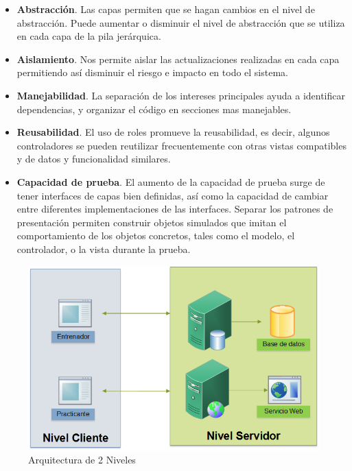 \begin{itemize}
	\item \textbf{Abstracción}. Las capas permiten que se hagan cambios en el nivel de abstracción. Puede aumentar o disminuir el nivel de abstracción que se utiliza en cada capa de la pila jerárquica.
	\item \textbf{Aislamiento}. Nos permite aislar las actualizaciones realizadas en cada capa permitiendo así disminuir el riesgo e impacto en todo el sistema.
	\item \textbf{Manejabilidad}. La separación de los intereses principales ayuda a identificar dependencias, y organizar el código en secciones mas manejables.
	\item \textbf{Reusabilidad}. El uso de roles promueve la reusabilidad, es decir, algunos controladores se pueden reutilizar frecuentemente con otras vistas compatibles y de datos y funcionalidad similares.
	\item \textbf{Capacidad de prueba}. El aumento de la capacidad de prueba surge de tener interfaces de capas bien definidas, así como la capacidad de cambiar entre diferentes implementaciones de las interfaces. Separar los patrones de presentación permiten construir objetos simulados que imitan el comportamiento de los objetos concretos, tales como el modelo, el controlador, o la vista durante la prueba.
\end{itemize}

\begin{figure}[H]
	\begin{center}
		\includegraphics[scale=0.5]{./Figuras/Arquitectura/Arquitectura2Niveles}
	\end{center}
	\caption{Arquitectura de 2 Niveles}
	\label{fig:Arquitectura2Niveles}
\end{figure}

